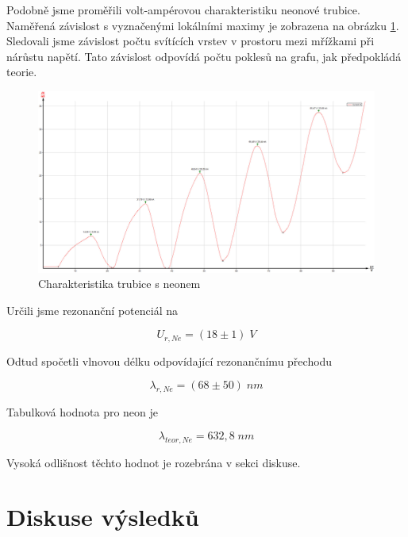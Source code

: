Podobně jsme proměřili volt-ampérovou charakteristiku neonové trubice. Naměřená závislost s vyznačenými lokálními maximy je zobrazena na obrázku \ref{fig:neon}. Sledovali jsme závislost počtu svítících vrstev v prostoru mezi mřížkami při nárůstu napětí. Tato závislost odpovídá počtu poklesů na grafu, jak předpokládá teorie.

\begin{figure}[!h]
    \centering
    \includegraphics[width=1\linewidth]{A16 - Frank-Hertz/Ne.jpg}
    \caption{Charakteristika trubice s neonem}
    \label{fig:neon}
\end{figure}

Určili jsme rezonanční potenciál na

\begin{equation}
    U_{r,Ne} = (18 \pm 1) \; V
\end{equation}

Odtud spočetli vlnovou délku odpovídající rezonančnímu přechodu

\begin{equation}
    \lambda_{r,Ne} = (68 \pm 50) \; nm
\end{equation}

Tabulková hodnota pro neon je

\begin{equation}
    \lambda_{teor,Ne} = 632,8 \; nm
\end{equation}

Vysoká odlišnost těchto hodnot je rozebrána v sekci diskuse.

    
\newpage
\section{Diskuse výsledků}


